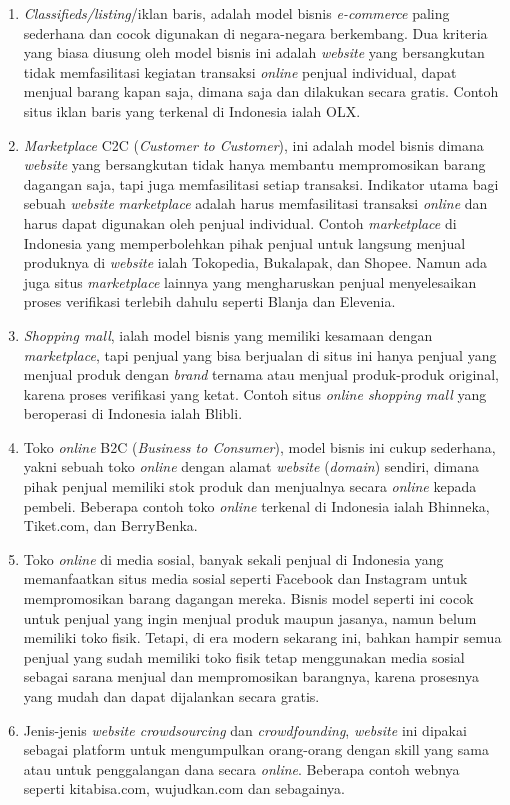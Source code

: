 \begin{enumerate}
	\item \textit{Classifieds/listing}/iklan baris, adalah model bisnis \textit{e-commerce} paling sederhana dan cocok digunakan di negara-negara berkembang. Dua kriteria yang biasa diusung oleh model bisnis ini adalah \textit{website} yang bersangkutan tidak memfasilitasi kegiatan transaksi \textit{online} penjual individual, dapat menjual barang kapan saja, dimana saja dan dilakukan secara gratis. Contoh situs iklan baris yang terkenal di Indonesia ialah OLX.
	\item \textit{Marketplace} C2C (\textit{Customer to Customer}), ini adalah model bisnis dimana \textit{website} yang bersangkutan tidak hanya membantu mempromosikan barang dagangan saja, tapi juga memfasilitasi setiap transaksi. Indikator utama bagi sebuah \textit{website} \textit{marketplace} adalah harus memfasilitasi transaksi \textit{online} dan harus dapat digunakan oleh penjual individual.
	Contoh \textit{marketplace} di Indonesia yang memperbolehkan pihak penjual untuk langsung menjual produknya di \textit{website} ialah Tokopedia, Bukalapak, dan Shopee. Namun ada juga situs \textit{marketplace} lainnya yang mengharuskan penjual menyelesaikan proses verifikasi terlebih dahulu seperti Blanja dan Elevenia.
	\item \textit{Shopping mall}, ialah model bisnis yang memiliki kesamaan dengan \textit{marketplace}, tapi penjual yang bisa berjualan di situs ini hanya penjual yang menjual produk dengan \textit{brand} ternama atau menjual produk-produk original, karena proses verifikasi yang ketat. Contoh situs \textit{online shopping mall} yang beroperasi di Indonesia ialah Blibli.
	\item Toko \textit{online} B2C (\textit{Business to Consumer}), model bisnis ini cukup sederhana, yakni sebuah toko \textit{online} dengan alamat \textit{website} (\textit{domain}) sendiri, dimana pihak penjual memiliki stok produk dan menjualnya secara \textit{online} kepada pembeli.
	Beberapa contoh toko \textit{online} terkenal di Indonesia ialah Bhinneka, Tiket.com, dan BerryBenka.
	\item Toko \textit{online} di media sosial, banyak sekali penjual di Indonesia yang memanfaatkan situs media sosial seperti Facebook dan Instagram untuk mempromosikan barang dagangan mereka. Bisnis model seperti ini cocok untuk penjual yang ingin menjual produk maupun jasanya, namun belum memiliki toko fisik. Tetapi, di era modern sekarang ini, bahkan hampir semua penjual yang sudah memiliki toko fisik tetap menggunakan media sosial sebagai sarana menjual dan mempromosikan barangnya, karena prosesnya yang mudah dan dapat dijalankan secara gratis.
	\item Jenis-jenis \textit{website crowdsourcing} dan \textit{crowdfounding}, \textit{website} ini dipakai sebagai platform untuk mengumpulkan orang-orang dengan skill yang sama atau untuk penggalangan dana secara \textit{online}.
	Beberapa contoh webnya seperti kitabisa.com, wujudkan.com dan sebagainya.
\end{enumerate}


